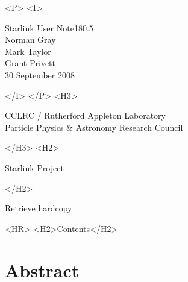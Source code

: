 \documentclass[twoside,11pt]{article}
\newcommand{\stardoccategory}  {Starlink User Note}
\newcommand{\stardocsource}    {sun\stardocnumber}
\newcommand{\stardocnumber}    {180.5}
\newcommand{\stardocauthors}   {Norman Gray\\Mark Taylor\\Grant Privett}
\newcommand{\stardocdate}      {30 September 2008}
\newcommand{\htmladdnormallink}[2]{#1}
\newcommand{\htmladdimg}[1]{}
\newcommand{\htmlref}[2]{#1}
\newcommand{\htmladdtonavigation}[1]{}
\newcommand{\xlabel}[1]{}
\newcommand{\latexonlytoc}[0]{\tableofcontents}
\begin{document}
\begin{htmlonly}
   \begin{rawhtml} <P> <I> \end{rawhtml}
   \stardoccategory \stardocnumber \\
   \stardocauthors \\
   \stardocdate
   \begin{rawhtml} </I> </P> <H3> \end{rawhtml}
      \htmladdnormallink{CCLRC}{http://www.cclrc.ac.uk} /
      \htmladdnormallink{Rutherford Appleton Laboratory}
                        {http://www.cclrc.ac.uk/ral} \\
      \htmladdnormallink{Particle Physics \& Astronomy Research Council}
                        {http://www.pparc.ac.uk} \\
   \begin{rawhtml} </H3> <H2> \end{rawhtml}
      \htmladdnormallink{Starlink Project}{http://www.starlink.ac.uk/}
   \begin{rawhtml} </H2> \end{rawhtml}
   \htmladdnormallink{\htmladdimg{source.gif} Retrieve hardcopy}
      {http://www.starlink.ac.uk/cgi-bin/hcserver?\stardocsource}\\

  \label{stardoccontents}
  \begin{rawhtml}
    <HR>
    <H2>Contents</H2>
  \end{rawhtml}
  \renewcommand{\latexonlytoc}[0]{}
  \htmladdtonavigation{\htmlref{\htmladdimg{contents_motif.gif}}
        {stardoccontents}}

  \section{\xlabel{abstract}Abstract}
\end{htmlonly}
\end{document}
